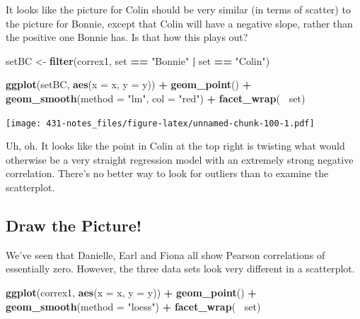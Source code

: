 \documentclass[
]{book}
\newenvironment{Shaded}{\begin{snugshade}}{\end{snugshade}}
\newcommand{\DataTypeTok}[1]{\textcolor[rgb]{0.13,0.29,0.53}{#1}}
\newcommand{\KeywordTok}[1]{\textcolor[rgb]{0.13,0.29,0.53}{\textbf{#1}}}
\newcommand{\NormalTok}[1]{#1}
\newcommand{\OperatorTok}[1]{\textcolor[rgb]{0.81,0.36,0.00}{\textbf{#1}}}
\newcommand{\StringTok}[1]{\textcolor[rgb]{0.31,0.60,0.02}{#1}}
\begin{document}
It looks like the picture for Colin should be very similar (in terms of scatter) to the picture for Bonnie, except that Colin will have a negative slope, rather than the positive one Bonnie has. Is that how this plays out?

\begin{Shaded}
\begin{Highlighting}[]
\NormalTok{setBC <-}\StringTok{ }\KeywordTok{filter}\NormalTok{(correx1, set }\OperatorTok{==}\StringTok{ "Bonnie"} \OperatorTok{|}\StringTok{ }\NormalTok{set }\OperatorTok{==}\StringTok{ "Colin"}\NormalTok{)}

\KeywordTok{ggplot}\NormalTok{(setBC, }\KeywordTok{aes}\NormalTok{(}\DataTypeTok{x =}\NormalTok{ x, }\DataTypeTok{y =}\NormalTok{ y)) }\OperatorTok{+}\StringTok{ }
\StringTok{    }\KeywordTok{geom_point}\NormalTok{() }\OperatorTok{+}
\StringTok{    }\KeywordTok{geom_smooth}\NormalTok{(}\DataTypeTok{method =} \StringTok{"lm"}\NormalTok{, }\DataTypeTok{col =} \StringTok{"red"}\NormalTok{) }\OperatorTok{+}
\StringTok{    }\KeywordTok{facet_wrap}\NormalTok{(}\OperatorTok{~}\StringTok{ }\NormalTok{set)}
\end{Highlighting}
\end{Shaded}

\texttt{[image: 431-notes\_files/figure-latex/unnamed-chunk-100-1.pdf]}

Uh, oh. It looks like the point in Colin at the top right is twisting what would otherwise be a very straight regression model with an extremely strong negative correlation. There's no better way to look for outliers than to examine the scatterplot.

\hypertarget{draw-the-picture}{%
\subsection{Draw the Picture!}\label{draw-the-picture}}

We've seen that Danielle, Earl and Fiona all show Pearson correlations of essentially zero. However, the three data sets look very different in a scatterplot.

\begin{Shaded}
\begin{Highlighting}[]
\KeywordTok{ggplot}\NormalTok{(correx1, }\KeywordTok{aes}\NormalTok{(}\DataTypeTok{x =}\NormalTok{ x, }\DataTypeTok{y =}\NormalTok{ y)) }\OperatorTok{+}
\StringTok{    }\KeywordTok{geom_point}\NormalTok{() }\OperatorTok{+}
\StringTok{    }\KeywordTok{geom_smooth}\NormalTok{(}\DataTypeTok{method =} \StringTok{"loess"}\NormalTok{) }\OperatorTok{+}
\StringTok{    }\KeywordTok{facet_wrap}\NormalTok{(}\OperatorTok{~}\StringTok{ }\NormalTok{set)}
\end{Highlighting}
\end{Shaded}
\end{document}
